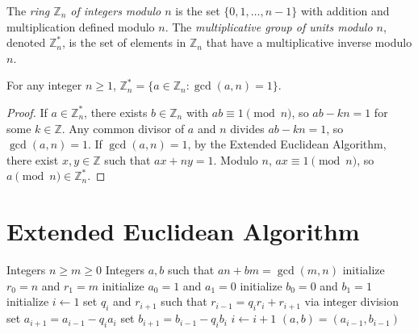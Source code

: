 
\begin{definition}
    The \emph{ring $\mathbb{Z}_n$ of integers modulo $n$} is the set $\{0, 1, \ldots, n-1\}$ with addition and multiplication defined modulo $n$.
    The \emph{multiplicative group of units modulo $n$}, denoted $\mathbb{Z}_n^*$, is the set of elements in $\mathbb{Z}_n$ that have a multiplicative inverse modulo $n$.
\end{definition}

\begin{theorem}
    For any integer \(n \geq 1\), \(\mathbb{Z}_n^* = \{a \in \mathbb{Z}_n : \gcd(a, n) = 1\}\).
\end{theorem}

\begin{proof}
    If \(a \in \mathbb{Z}_n^*\), there exists \(b \in \mathbb{Z}_n\) with \(ab \equiv 1 \pmod n\), so \(ab - kn = 1\) for some \(k \in \mathbb{Z}\). Any common divisor of \(a\) and \(n\) divides \(ab - kn = 1\), so \(\gcd(a, n) = 1\).
    If \(\gcd(a, n) = 1\), by the Extended Euclidean Algorithm, there exist \(x, y \in \mathbb{Z}\) such that \(ax + ny = 1\). Modulo \(n\), \(ax \equiv 1 \pmod n\), so \(a \pmod n \in \mathbb{Z}_n^*\).
\end{proof}

\section*{Extended Euclidean Algorithm}

\begin{algorithm}[htbp]
    \caption{Extended Euclidean Algorithm}
    \begin{algorithmic}[1]
        \Require Integers \(n \geq m \geq 0\)
        \Ensure Integers \(a, b\) such that \(an + bm = \gcd(m, n)\)
        \State initialize \(r_0 = n\) and \(r_1 = m\)
        \State initialize \(a_0 = 1\) and \(a_1 = 0\)
        \State initialize \(b_0 = 0\) and \(b_1 = 1\)
        \State initialize \(i \gets 1\)
            \State set \(q_i\) and \(r_{i+1}\) such that \(r_{i-1} = q_i r_i + r_{i+1}\) via integer division
            \State set \(a_{i+1} = a_{i-1} - q_i a_i\)
            \State set \(b_{i+1} = b_{i-1} - q_i b_i\)
            \State \(i \gets i + 1\)
        \EndWhile
        \State \Return \((a, b) = (a_{i-1}, b_{i-1})\)
    \end{algorithmic}
\end{algorithm}

